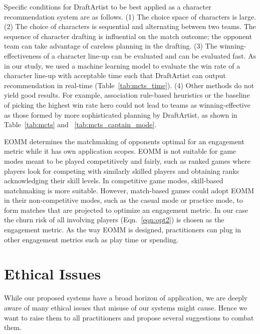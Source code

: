 Specific conditions for DraftArtist to be best applied as a character recommendation system are as follows. (1) The choice space of characters is large. (2) The choice of characters is sequential and alternating between two teams. The sequence of character drafting is influential on the match outcome; the opponent team can take advantage of careless planning in the drafting. (3) The winning-effectiveness of a character line-up can be evaluated and can be evaluated fast. As in our study, we used a machine learning model to evaluate the win rate of a character line-up with acceptable time such that DraftArtist can output recommendation in real-time (Table~\ref{tab:mcts_time}). (4) Other methods do not yield good results. For example, association rule-based heuristics or the baseline of picking the highest win rate hero could not lead to teams as winning-effective as those formed by more sophisticated planning by DraftArtist, as shown in Table~\ref{tab:mcts} and ~\ref{tab:mcts_captain_mode}.

EOMM determines the matchmaking of opponents optimal for an engagement metric while it has  own application scopes. EOMM is not suitable for game modes meant to be played competitively and fairly, such as ranked games where players look for competing with similarly skilled players and obtaining ranks acknowledging their skill levels. In competitive game modes, skill-based matchmaking is more suitable. However, match-based games could adopt EOMM in their non-competitive modes, such as the casual mode or practice mode, to form matches that are projected to optimize an engagement metric. In our case the churn risk of all involving players (Eqn.~\ref{eqn:opt2}) is chosen as the engagement metric. As the way EOMM is designed, practitioners can plug in other engagement metrics such as play time or spending. 



\section{Ethical Issues}\label{sec:ethical}
While our proposed systems have a broad horizon of application, we are deeply aware of many ethical issues that misuse of our systems might cause. Hence we want to raise them to all practitioners and propose several suggestions to combat them. 

